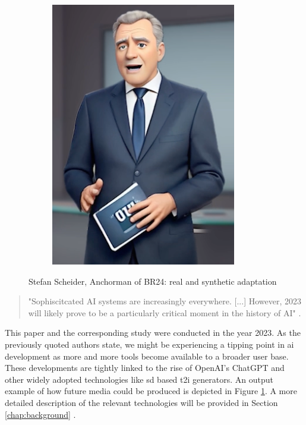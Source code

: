 \documentclass[
  a4paper,  %
  twoside,  %
  bibliography=totoc,
  headsepline,
  cleardoublepage=empty,
  parskip=half,
  draft=false
]{scrbook}
\begin{document}
\begin{figure}[h]
\begin{subfigure}[b]{0.4\textwidth}
    \includegraphics[width=\textwidth]{./graphics/images/scheider-sd.png}
  \end{subfigure}
  \caption{Stefan Scheider, Anchorman of BR24: real and synthetic adaptation}
  \label{fig:scheider-real-sd}
\end{figure}
\begin{quotation}
"Sophiscitcated AI systems are increasingly everywhere. [...] However, 2023 will likely prove to be a particularly critical moment in the history of AI" \cite{arguedasAutomatingDemocracyGenerative2023}.
\end{quotation}
This paper and the corresponding study were conducted in the year 2023. As the previously quoted authors state, we might be experiencing a tipping point in \gls{ai} development as more and more tools become available to a broader user base. These developments are tightly linked to the rise of OpenAI's ChatGPT and other widely adopted technologies like \gls{sd} based \gls{t2i} generators. An output example of how future media could be produced is depicted in Figure \ref{fig:scheider-real-sd}. A more detailed description of the relevant technologies will be provided in Section \ref{chap:background} . \\
\end{document}
